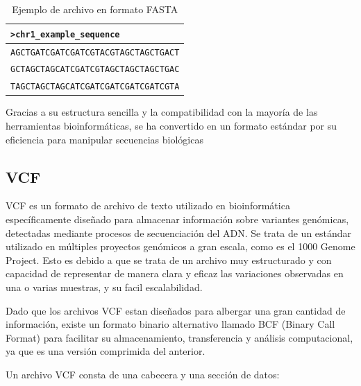 \documentclass[11pt,spanish,listoffigures,listoftables]{tfgetsinf}
\begin{document}
\begin{table}[H]
   \centering
   \caption{Ejemplo de archivo en formato \acs{FASTA}}
   \begin{tabular}{|l|}
   \hline
   \texttt{>chr1\_example\_sequence} \\ \hline
   \texttt{AGCTGATCGATCGATCGTACGTAGCTAGCTGACT} \\
   \texttt{GCTAGCTAGCATCGATCGTAGCTAGCTAGCTGAC} \\
   \texttt{TAGCTAGCTAGCATCGATCGATCGATCGATCGTA} \\
   \hline
   \end{tabular}
   \label{tabla:FASTA}
   \end{table}
   

Gracias a su estructura sencilla y la compatibilidad con la mayoría de las herramientas bioinformáticas, se ha convertido en un formato estándar por su eficiencia para manipular secuencias biológicas\cite{GEN}

\subsection{VCF}

\acs{VCF} es un formato de archivo de texto utilizado en bioinformática específicamente diseñado para almacenar información sobre variantes genómicas, detectadas mediante procesos de secuenciación del \acs{ADN}. Se trata de un estándar utilizado en múltiples proyectos genómicos a gran escala, como es el 1000 Genome Project\cite{AUT}. Esto es debido a que se trata de un archivo muy estructurado y con capacidad de representar de manera clara y eficaz las variaciones observadas en una o varias muestras, y su facil escalabilidad\cite{EMB}.

Dado que los archivos \acs{VCF} estan diseñados para albergar una gran cantidad de información, existe un formato binario alternativo llamado BCF (Binary Call Format) para facilitar su almacenamiento, transferencia y análisis computacional, ya que es una versión comprimida del anterior. 

Un archivo \acs{VCF} consta de una cabecera y una sección de datos: 
\end{document}
